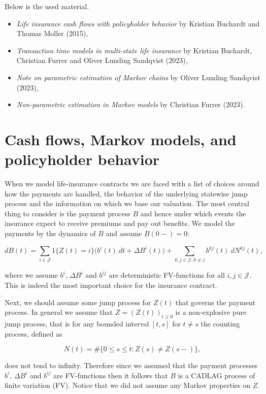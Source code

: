 \documentclass[a4paper,10pt,openany]{book}
\providecommand{\tightlist}{%
 \setlength{\itemsep}{0pt}\setlength{\parskip}{0pt}}
\begin{document}
Below is the used material.

\begin{itemize}
\tightlist
\item
  \emph{Life insurance cash flows with policyholder behavior} by Kristian Buchardt and Thomas Moller (2015),
\item
  \emph{Transaction time models in multi-state life insurance} by Kristian Buchardt, Christian Furrer and Oliver Lunding Sandqvist (2023),
\item
  \emph{Note on parametric estimation of Markov chains} by Oliver Lunding Sandqvist (2023),
\item
  \emph{Non-parametric estimation in Markov models} by Christian Furrer (2023).
\end{itemize}

\hypertarget{cash-flows-markov-models-and-policyholder-behavior}{%
\section{Cash flows, Markov models, and policyholder behavior}\label{cash-flows-markov-models-and-policyholder-behavior}}

When we model life-insurance contracts we are faced with a list of choices around how the payments are handled, the behavior of the underlying statewise jump process and the information on which we base our valuation. The most central thing to consider is the payment process \(B\) and hence under which events the insurance expect to receive premiums and pay out benefits. We model the payments by the dynamics of \(B\) and assume \(B(0-)=0\):

\[
dB(t)=\sum_{i\in \mathcal J}1\{Z(t)=i\}\Big(b^{i}(t)\ dt+ \Delta B^i(t)\Big)+\sum_{k,j\in \mathcal J, k\ne j}b^{kj}(t)\ dN^{kj}(t),
\]

where we assume \(b^i\), \(\Delta B^i\) and \(b^{ij}\) are deterministic FV-functions for all \(i,j\in \mathcal J\). This is indeed the most important choice for the insurance contract.

Next, we should assume some jump process for \(Z(t)\) that governs the payment process. In general we assume that \(Z=(Z(t))_{t\ge 0}\) is a non-explosive pure jump process, that is for any bounded interval \([t,s]\) for \(t\ne s\) the counting process, defined as

\[
N(t)=\#\{0\le s\le t : Z(s)\ne Z(s-)\},
\]

does not tend to infinity. Therefore since we assumed that the payment processes \(b^i\), \(\Delta B^i\) and \(b^{ij}\) are FV-functions then it follows that \(B\) is a CADLAG process of finite variation (FV). Notice that we did not assume any Markov properties on \(Z\).
\end{document}
